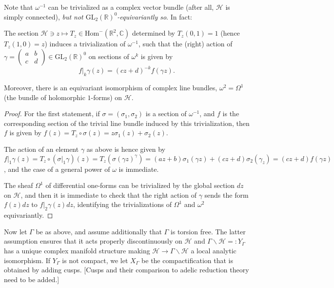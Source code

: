 Note that $\omega^{-1}$ can be trivialized as a complex vector bundle (after all, $\mathcal H$ is simply connected), \emph{but not $\text{GL}_2(\mathbb R)^0$-equivariantly so}. In fact:

\begin{lemma}
 \label{lemma-trivialization-omega}
The section $\mathcal H \ni z \mapsto T_z \in \text{Hom}^-(\mathbb R^2,\mathbb C)$ determined by $T_z(0,1)=1$ (hence $T_z(1,0)=z$) induces a trivialization of $\omega^{-1}$, such that the (right) action of  $\gamma = \begin{pmatrix}  a & b \\ c& d \end{pmatrix} \in \text{GL}_2(\mathbb R)^0$ on sections of $\omega^k$ is given by 
\begin{equation}
 \label{equation-action-omegak}
f|_k\gamma (z) = (cz + d)^{-k}f(\gamma z).
\end{equation}

 
Moreover, there is an equivariant isomorphism of complex line bundles, $\omega^2 = \Omega^1$ (the bundle of holomorphic $1$-forms) on $\mathcal H$.
\end{lemma}


\begin{proof}
 For the first statement, if $\sigma = (\sigma_1, \sigma_2)$ is a section of $\omega^{-1}$, and $f$ is the corresponding section of the trivial line bundle induced by this trivialization, then $f$ is given by $f(z) = T_z\circ \sigma(z) =  z\sigma_1(z)+\sigma_2(z)$. 
 
 The action of an element $\gamma$ as above is hence given by $f|_1\gamma (z) = T_z \circ (\sigma|_1\gamma)(z) = T_z(\sigma(\gamma z)^\gamma) = (az+b) \sigma_1(\gamma z) + (cz+d)\sigma_2(\gamma_z) = (cz+d) f(\gamma z)$, and the case of a general power of $\omega$ is immediate.
 
 The sheaf $\Omega^1$ of differential one-forms can be trivialized by the global section $dz$ on $\mathcal H$, and then it is immediate to check that the right action of $\gamma$ sends the form $f(z) dz$ to $f|_2\gamma(z) dz$, identifying the trivializations of $\Omega^1$ and $\omega^2$ equivariantly.
\end{proof}


Now let $\Gamma$ be as above, and assume additionally that $\Gamma$ is torsion free. The latter assumption ensures that it acts properly discontinuously on $\mathcal{H}$ and $\Gamma \backslash \mathcal{H} =: Y_{\Gamma}$ has a unique complex manifold structure making $\mathcal{H} \to \Gamma \backslash \mathcal{H}$ a local analytic isomorphism. If $Y_\Gamma$ is not compact, we let $X_\Gamma$ be the compactification that is obtained by adding cusps. [Cusps and their comparison to adelic reduction theory need to be added.]

